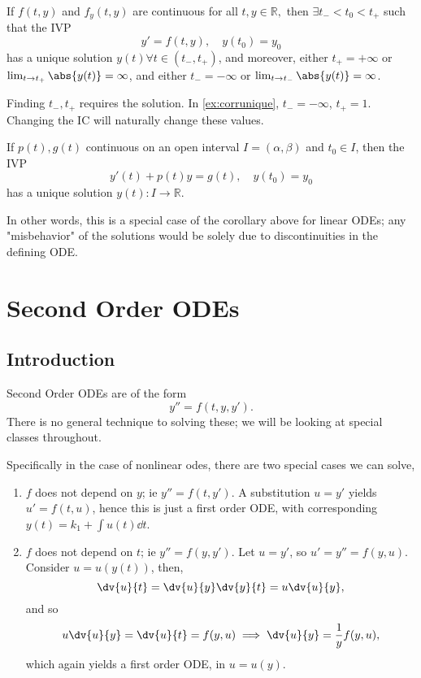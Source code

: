 \begin{corollary}
    If $f(t, y)$ and $f_y(t, y)$ are continuous for all $t, y \in \mathbb{R},$ then $\exists t_- < t_0 < t_+$ such that the IVP \[
    y' = f(t, y), \quad y(t_0) = y_0    
    \]
    has a unique solution $y(t) \forall t \in (t_-, t_+)$, and moreover, either $t_+ = + \infty$ or $\lim_{t \to t_+} \abs{y(t)} = \infty$, and either $t_- = - \infty$ or $\lim_{t \to t_-} \abs{y(t)} = \infty$.
\end{corollary}

\begin{remark}
    Finding $t_-, t_+$ requires the solution. In \cref{ex:corrunique}, $t_- = - \infty$, $t_+ = 1$. Changing the IC will naturally change these values.
\end{remark}

\begin{theorem}
    If $p(t), g(t)$ continuous on an open interval $I = (\alpha, \beta)$ and $t_0 \in I$, then the IVP\[
    y'(t) + p(t) y = g(t), \quad y(t_0) = y_0
    \]
    has a unique solution $y(t): I \to \mathbb{R}$.
\end{theorem}

\begin{remark}
    In other words, this is a special case of the corollary above for linear ODEs; any "misbehavior" of the solutions would be solely due to discontinuities in the defining ODE.
\end{remark}

\section{Second Order ODEs}

\subsection{Introduction}

Second Order ODEs are of the form \[
y'' = f(t, y, y').
\]
There is no general technique to solving these; we will be looking at special classes throughout.

Specifically in the case of nonlinear odes, there are two special cases we can solve, \begin{enumerate}
    \item $f$ does not depend on $y$; ie $y'' = f(t, y')$. A substitution $u=y'$ yields $u' = f(t, u)$, hence this is just a first order ODE, with corresponding $y(t) =k_1 + \int u(t) \dd{t}$.
    \item $f$ does not depend on $t$; ie $y'' = f(y, y')$. Let $u = y'$, so $u' = y'' = f(y, u)$. Consider $u = u(y(t))$, then, \[
    \dv{u}{t}= \dv{u}{y}\dv{y}{t} = u \dv{u}{y},
    \]
    and so \[
    u \dv{u}{y} = \dv{u}{t} = f(y, u) \implies \dv{u}{y} = \frac{1}{y} f(y, u),    
    \]
    which again yields a first order ODE, in $u = u(y)$.
\end{enumerate}

